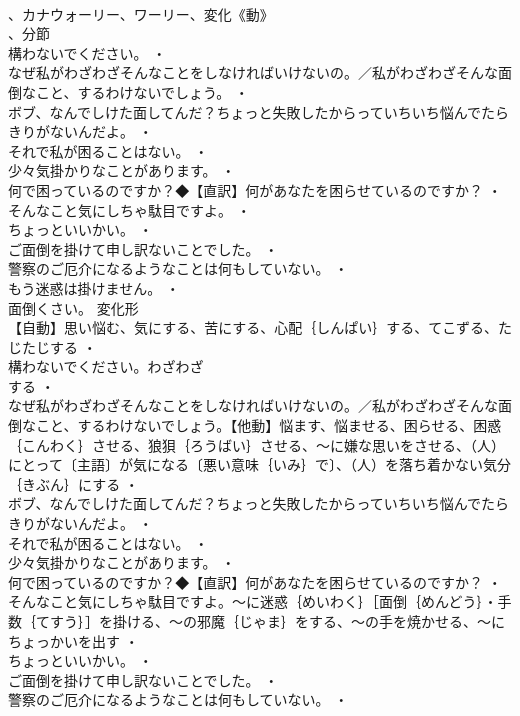 \documentclass[8pt]{extreport}
\begin{document}
\begin{CJK}{UTF8}{min}
\\	、カナウォーリー、ワーリー、変化《動》
\\	、分節
\\	構わないでください。 ・
\\	なぜ私がわざわざそんなことをしなければいけないの。／私がわざわざそんな面倒なこと、するわけないでしょう。 ・
\\	ボブ、なんでしけた面してんだ？ちょっと失敗したからっていちいち悩んでたらきりがないんだよ。 ・
\\	それで私が困ることはない。 ・
\\	少々気掛かりなことがあります。 ・
\\	何で困っているのですか？◆【直訳】何があなたを困らせているのですか？ ・
\\	そんなこと気にしちゃ駄目ですよ。 ・
\\	ちょっといいかい。 ・
\\	ご面倒を掛けて申し訳ないことでした。 ・
\\	警察のご厄介になるようなことは何もしていない。 ・
\\	もう迷惑は掛けません。 ・
\\	面倒くさい。	変化形 
\\	【自動】思い悩む、気にする、苦にする、心配｛しんぱい｝する、てこずる、たじたじする ・
\\	構わないでください。わざわざ
\\	する ・
\\	なぜ私がわざわざそんなことをしなければいけないの。／私がわざわざそんな面倒なこと、するわけないでしょう。【他動】悩ます、悩ませる、困らせる、困惑｛こんわく｝させる、狼狽｛ろうばい｝させる、～に嫌な思いをさせる、（人）にとって〔主語〕が気になる〔悪い意味｛いみ｝で〕、（人）を落ち着かない気分｛きぶん｝にする ・
\\	ボブ、なんでしけた面してんだ？ちょっと失敗したからっていちいち悩んでたらきりがないんだよ。 ・
\\	それで私が困ることはない。 ・
\\	少々気掛かりなことがあります。 ・
\\	何で困っているのですか？◆【直訳】何があなたを困らせているのですか？ ・
\\	そんなこと気にしちゃ駄目ですよ。～に迷惑｛めいわく｝［面倒｛めんどう｝・手数｛てすう｝］を掛ける、～の邪魔｛じゃま｝をする、～の手を焼かせる、～にちょっかいを出す ・
\\	ちょっといいかい。 ・
\\	ご面倒を掛けて申し訳ないことでした。 ・
\\	警察のご厄介になるようなことは何もしていない。 ・

\end{CJK}
\end{document}
